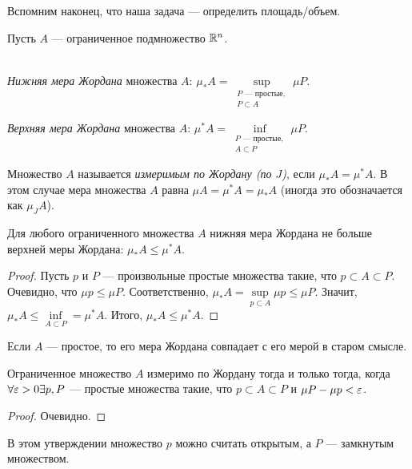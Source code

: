 Вспомним наконец, что наша задача --- определить площадь/объем.

Пусть $A$ --- ограниченное подмножество $\mathbb{R}^n$.

\begin{Def}\ \\
\textit{Нижняя мера Жордана} множества $A$: $\mu_*A = \sup\limits_{\substack{P \text{ --- простые},\\ P \subset A}} \mu P$.

\textit{Верхняя мера Жордана} множества $A$: $\mu^*A = \inf\limits_{\substack{P \text{ --- простые},\\ A \subset P}} \mu P$.
\end{Def}

\begin{Def}
Множество $A$ называется \textit{измеримым по Жордану (по $J$)}, если $\mu_*A = \mu^*A$. В этом случае мера множества $A$ равна $\mu A = \mu^*A=\mu_*A$ (иногда это обозначается как $\mu_J A$).
\end{Def}

\begin{Statement}
Для любого ограниченного множества $A$ нижняя мера Жордана не больше верхней меры Жордана: $\mu_*A \leq \mu^*A$.
\end{Statement}
\begin{proof}
Пусть $p$ и $P$ --- произвольные простые множества такие, что $p \subset A \subset P$. Очевидно, что $\mu p \leq \mu P$. Соответственно, $\mu_* A = \sup\limits_{p \subset A} \mu p \leq \mu P$. Значит, $\mu_*A \leq \inf\limits_{A \subset P} = \mu^* A$. Итого, $\mu_* A \leq \mu^* A$.
\end{proof}

\begin{Statement}
Если $A$ --- простое, то его мера Жордана совпадает с его мерой в старом смысле.
\end{Statement}

\begin{Statement}
Ограниченное множество $A$ измеримо по Жордану тогда и только тогда, когда $\forall \varepsilon > 0 \exists p, P$ --- простые множества такие, что $p \subset A \subset P$ и $\mu P - \mu p < \varepsilon$.
\end{Statement}
\begin{proof}
Очевидно.
\end{proof}

\begin{Comment}
В этом утверждении множество $p$ можно считать открытым, а $P$ --- замкнутым множеством.
\end{Comment}

